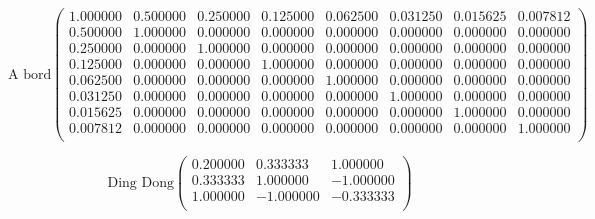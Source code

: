 \documentclass{report}
\begin{document}
      \begin{equation}
      \textrm{A bord}
      \begin{pmatrix}
      1.000000 & 0.500000 & 0.250000 & 0.125000 & 0.062500 & 0.031250 & 0.015625 & 0.007812 \\ 
      0.500000 & 1.000000 & 0.000000 & 0.000000 & 0.000000 & 0.000000 & 0.000000 & 0.000000 \\ 
      0.250000 & 0.000000 & 1.000000 & 0.000000 & 0.000000 & 0.000000 & 0.000000 & 0.000000 \\ 
      0.125000 & 0.000000 & 0.000000 & 1.000000 & 0.000000 & 0.000000 & 0.000000 & 0.000000 \\ 
      0.062500 & 0.000000 & 0.000000 & 0.000000 & 1.000000 & 0.000000 & 0.000000 & 0.000000 \\ 
      0.031250 & 0.000000 & 0.000000 & 0.000000 & 0.000000 & 1.000000 & 0.000000 & 0.000000 \\ 
      0.015625 & 0.000000 & 0.000000 & 0.000000 & 0.000000 & 0.000000 & 1.000000 & 0.000000 \\ 
      0.007812 & 0.000000 & 0.000000 & 0.000000 & 0.000000 & 0.000000 & 0.000000 & 1.000000 \\ 
      \end{pmatrix}
      \label{syst2}
      \end{equation}
      
      \begin{equation}
      \textrm{Ding Dong}
      \begin{pmatrix}
      0.200000 & 0.333333 & 1.000000 \\ 
      0.333333 & 1.000000 & -1.000000 \\ 
      1.000000 & -1.000000 & -0.333333 \\ 
      \end{pmatrix}
      \label{syst3}
      \end{equation}
      
\end{document}
